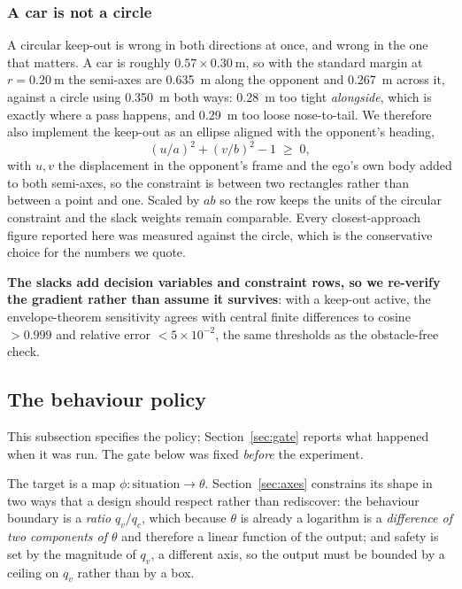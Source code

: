 \documentclass[letterpaper, 10 pt, conference]{ieeeconf}
\begin{document}
\subsubsection*{A car is not a circle}
A circular keep-out is wrong in both directions at once, and wrong in the one
that matters. A car is roughly $0.57 \times \SI{0.30}{\meter}$, so with the
standard margin at $r = \SI{0.20}{\meter}$ the semi-axes are
\SI{0.635}{\meter} along the opponent and \SI{0.267}{\meter} across it, against
a circle using \SI{0.350}{\meter} both ways: \SI{0.28}{\meter} too tight
\emph{alongside}, which is exactly where a pass happens, and \SI{0.29}{\meter}
too loose nose-to-tail. We therefore also implement the keep-out as an ellipse
aligned with the opponent's heading,
\begin{equation}
  (u/a)^2 + (v/b)^2 - 1 \;\ge\; 0,
  \label{eq:ellipse}
\end{equation}
with $u, v$ the displacement in the opponent's frame and the ego's own body
added to both semi-axes, so the constraint is between two rectangles rather
than between a point and one. Scaled by $ab$ so the row keeps the units of the
circular constraint and the slack weights remain comparable. Every
closest-approach figure reported here was measured against the circle, which is
the conservative choice for the numbers we quote.

\textbf{The slacks add decision variables and constraint rows, so we re-verify
the gradient rather than assume it survives}: with a keep-out active, the
envelope-theorem sensitivity agrees with central finite differences to cosine
$> 0.999$ and relative error $< 5\times10^{-2}$, the same thresholds as the
obstacle-free check.

\subsection{The behaviour policy}\label{sec:policy}
This subsection specifies the policy; Section~\ref{sec:gate} reports what
happened when it was run. The gate below was fixed \emph{before} the
experiment.

The target is a map $\phi : \text{situation} \to \theta$. Section~\ref{sec:axes}
constrains its shape in two ways that a design should respect rather than
rediscover: the behaviour boundary is a \emph{ratio} $q_v/q_c$, which because
$\theta$ is already a logarithm is a \emph{difference of two components of
$\theta$} and therefore a linear function of the output; and safety is set by
the magnitude of $q_v$, a different axis, so the output must be bounded by a
ceiling on $q_v$ rather than by a box.
\end{document}
